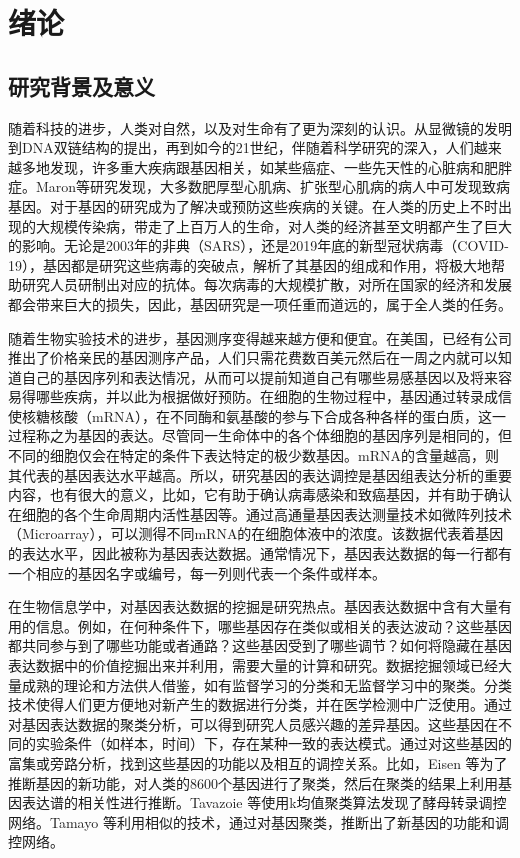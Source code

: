 \chapter{绪论}

\section{研究背景及意义}
    随着科技的进步，人类对自然，以及对生命有了更为深刻的认识。从显微镜的发明到DNA双链结构的提出，再到如今的21世纪，伴随着科学研究的深入，人们越来越多地发现，许多重大疾病跟基因相关，如某些癌症、一些先天性的心脏病和肥胖症。Maron等研究发现，大多数肥厚型心肌病、扩张型心肌病的病人中可发现致病基因。对于基因的研究成为了解决或预防这些疾病的关键。在人类的历史上不时出现的大规模传染病，带走了上百万人的生命，对人类的经济甚至文明都产生了巨大的影响。无论是2003年的非典（SARS），还是2019年底的新型冠状病毒（COVID-19），基因都是研究这些病毒的突破点，解析了其基因的组成和作用，将极大地帮助研究人员研制出对应的抗体。每次病毒的大规模扩散，对所在国家的经济和发展都会带来巨大的损失，因此，基因研究是一项任重而道远的，属于全人类的任务。

    随着生物实验技术的进步，基因测序变得越来越方便和便宜。在美国，已经有公司推出了价格亲民的基因测序产品，人们只需花费数百美元然后在一周之内就可以知道自己的基因序列和表达情况，从而可以提前知道自己有哪些易感基因以及将来容易得哪些疾病，并以此为根据做好预防。在细胞的生物过程中，基因通过转录成信使核糖核酸（mRNA），在不同酶和氨基酸的参与下合成各种各样的蛋白质，这一过程称之为基因的表达。尽管同一生命体中的各个体细胞的基因序列是相同的，但不同的细胞仅会在特定的条件下表达特定的极少数基因。mRNA的含量越高，则其代表的基因表达水平越高。所以，研究基因的表达调控是基因组表达分析的重要内容，也有很大的意义，比如，它有助于确认病毒感染和致癌基因，并有助于确认在细胞的各个生命周期内活性基因等。通过高通量基因表达测量技术如微阵列技术（Microarray），可以测得不同mRNA的在细胞体液中的浓度。该数据代表着基因的表达水平，因此被称为基因表达数据。通常情况下，基因表达数据的每一行都有一个相应的基因名字或编号，每一列则代表一个条件或样本。

    在生物信息学中，对基因表达数据的挖掘是研究热点。基因表达数据中含有大量有用的信息。例如，在何种条件下，哪些基因存在类似或相关的表达波动？这些基因都共同参与到了哪些功能或者通路？这些基因受到了哪些调节？如何将隐藏在基因表达数据中的价值挖掘出来并利用，需要大量的计算和研究。数据挖掘领域已经大量成熟的理论和方法供人借鉴，如有监督学习的分类和无监督学习中的聚类。分类技术使得人们更方便地对新产生的数据进行分类，并在医学检测中广泛使用。通过对基因表达数据的聚类分析，可以得到研究人员感兴趣的差异基因。这些基因在不同的实验条件（如样本，时间）下，存在某种一致的表达模式。通过对这些基因的富集或旁路分析，找到这些基因的功能以及相互的调控关系。比如，Eisen 等为了推断基因的新功能，对人类的8600个基因进行了聚类，然后在聚类的结果上利用基因表达谱的相关性进行推断。Tavazoie 等使用k均值聚类算法发现了酵母转录调控网络。Tamayo 等利用相似的技术，通过对基因聚类，推断出了新基因的功能和调控网络。 

